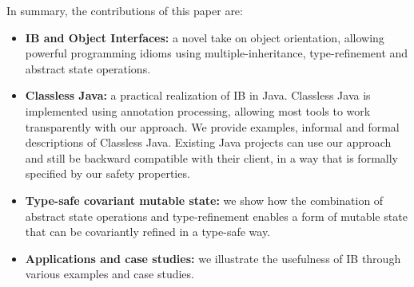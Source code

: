 In summary, the contributions of this paper are:
\begin{itemize}

\item {\bf IB and Object Interfaces:} a novel take on object orientation, allowing
  powerful programming idioms using multiple-inheritance, 
  type-refinement and abstract state operations.

\item {\bf Classless Java:} a practical realization of IB in
  Java. Classless Java is implemented using annotation processing, 
  allowing most tools to work transparently with our approach. 
  We provide examples, informal and formal descriptions of Classless
  Java.
  Existing Java projects can use our approach and still be
  backward compatible with their client, in a way that is formally specified
  by our safety properties.

\item {\bf Type-safe covariant mutable state:} we show how the 
 combination of abstract state operations and type-refinement enables 
 a form of mutable state that can be covariantly refined in a type-safe way.


\item {\bf Applications and case studies:} we illustrate the usefulness of IB
  through various examples and case studies.


\end{itemize}
